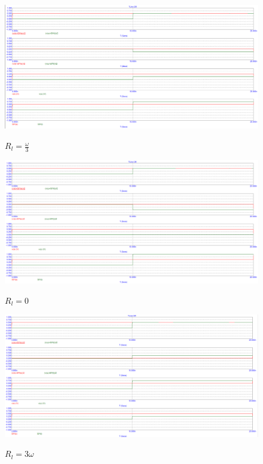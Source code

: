 \documentclass[a4paper, 12pt]{article}%
\begin{document}
\begin{figure}[h!]
\centering
\includegraphics[scale=0.4]{images/Graph4.png}
\label{fig:Image1}
\caption{$R_l = \frac{\omega}{3}$}
\end{figure}

\begin{figure}[h!]
\centering
\includegraphics[scale=0.4]{images/Graph5.png}
\label{fig:Image1}
\caption{$R_l = 0$}
\end{figure}

\begin{figure}[h!]
\centering
\includegraphics[scale=0.4]{images/Graph6.png}
\label{fig:Image1}
\caption{$R_l = 3\omega$}
\end{figure}
\end{document}
